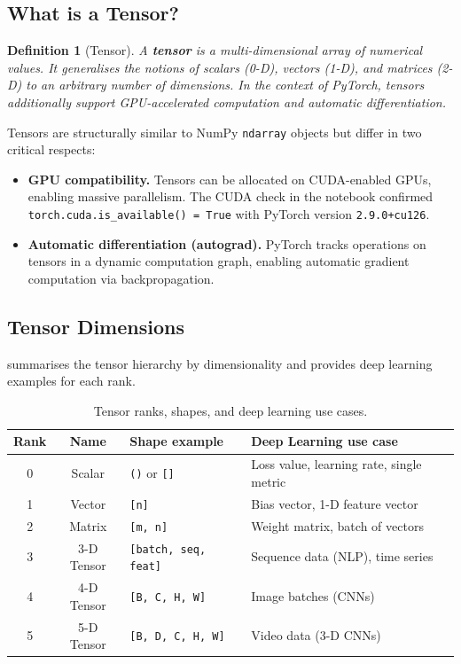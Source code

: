 \documentclass[12pt,a4paper]{article}
\newtheorem{definition}{Definition}[section]
\newcommand{\tbf}[1]{\textbf{#1}}
\newcommand{\ttt}[1]{\texttt{#1}}
\begin{document}
\subsection{What is a Tensor?}

\begin{definition}[Tensor]
\label{def:tensor}
A \tbf{tensor} is a multi-dimensional array of numerical values. It generalises
the notions of scalars (0-D), vectors (1-D), and matrices (2-D) to an arbitrary
number of dimensions. In the context of PyTorch, tensors additionally support
GPU-accelerated computation and automatic differentiation.
\end{definition}

Tensors are structurally similar to NumPy \ttt{ndarray} objects but differ in
two critical respects:

\begin{itemize}[leftmargin=*]
  \item \tbf{GPU compatibility.} Tensors can be allocated on CUDA-enabled
        GPUs, enabling massive parallelism. The CUDA check in the notebook
        confirmed \texttt{torch.cuda.is\_available() = True} with PyTorch
        version \ttt{2.9.0+cu126}.
  \item \tbf{Automatic differentiation (autograd).} PyTorch tracks operations
        on tensors in a dynamic computation graph, enabling automatic
        gradient computation via backpropagation.
\end{itemize}

\subsection{Tensor Dimensions}

 summarises the tensor hierarchy by dimensionality and
provides deep learning examples for each rank.

\begin{table}[ht]
  \centering
  \caption{Tensor ranks, shapes, and deep learning use cases.}
  \label{tab:tensor-dims}
  \begin{tabularx}{\linewidth}{c c X X}
    \toprule
    \tbf{Rank} & \tbf{Name} & \tbf{Shape example} & \tbf{Deep Learning use case} \\
    \midrule
    0 & Scalar     & \ttt{()} or \ttt{[]}    & Loss value, learning rate, single metric \\
    1 & Vector     & \ttt{[n]}               & Bias vector, 1-D feature vector \\
    2 & Matrix     & \ttt{[m, n]}            & Weight matrix, batch of vectors \\
    3 & 3-D Tensor & \ttt{[batch, seq, feat]}& Sequence data (NLP), time series \\
    4 & 4-D Tensor & \ttt{[B, C, H, W]}      & Image batches (CNNs) \\
    5 & 5-D Tensor & \ttt{[B, D, C, H, W]}   & Video data (3-D CNNs) \\
    \bottomrule
  \end{tabularx}
\end{table}
\end{document}
